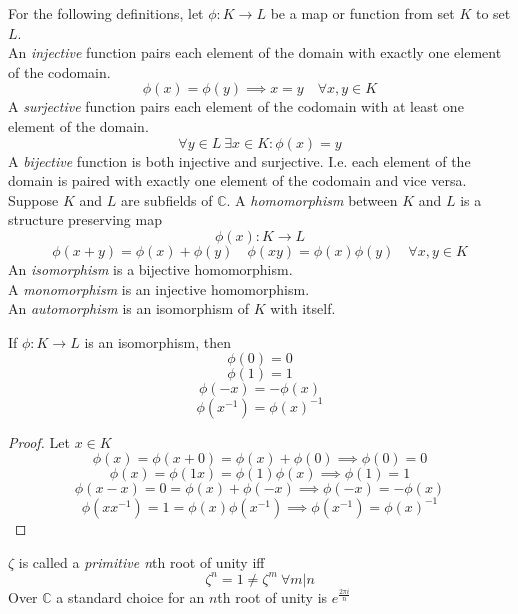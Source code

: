 \begin{definition}
    For the following definitions, let $\phi : K \to L$ be a map or function from set $K$ to set $L$.\\
    An \textit{injective} function pairs each element of the domain with exactly one element of the codomain.
    \[\phi(x) = \phi(y) \implies x = y \quad \forall x,y \in K\]
    A \textit{surjective} function pairs each element of the codomain with at least one element of the domain.
    \[\forall y \in L \ \exists x \in K : \phi(x) = y\]
    A \textit{bijective} function is both injective and surjective. 
    I.e. each element of the domain is paired with exactly one element of the codomain and vice versa.\\
    Suppose $K$ and $L$ are subfields of $\mathbb{C}$.
    A \textit{homomorphism} between $K$ and $L$ is a structure preserving map
    \[\phi(x) : K \to L\]
    \begin{equation*}\label{definition: homomorphism}
        \phi(x + y) = \phi(x) + \phi(y) \quad \phi(xy) = \phi(x)\phi(y) \quad \forall x,y \in K
    \end{equation*}
    An \textit{isomorphism} is a bijective homomorphism.\\
    A \textit{monomorphism} is an injective homomorphism.\\
    An \textit{automorphism} is an isomorphism of $K$ with itself.
\end{definition}

\begin{proposition}
    If $\phi : K \to L$ is an isomorphism, then
    \[\phi(0) = 0\]
    \[\phi(1) = 1\]
    \[\phi(-x) = -\phi(x)\]
    \[\phi(x^{-1}) = \phi(x)^{-1}\] 
\end{proposition}
\begin{proof}
    Let $x \in K$
    \[\phi(x) = \phi(x + 0) = \phi(x) + \phi(0) \implies \phi(0) = 0\]
    \[\phi(x) = \phi(1x) = \phi(1)\phi(x) \implies \phi(1) = 1\]
    \[\phi(x - x) = 0 = \phi(x) + \phi(-x) \implies \phi(-x) = -\phi(x)\]
    \[\phi(xx^{-1}) = 1 = \phi(x)\phi(x^{-1}) \implies \phi(x^{-1}) = \phi(x)^{-1}\]
\end{proof}

\begin{definition}
    $\zeta$ is called a \textit{primitive n}th root of unity iff
    \[\zeta^n = 1 \neq \zeta^m\ \forall m|n\]
    Over $\mathbb{C}$ a standard choice for an $n$th root of unity is $e^{\frac{2\pi i}{n}}$
\end{definition}

